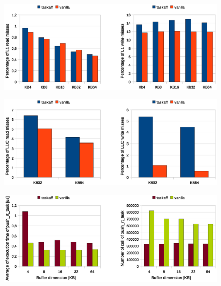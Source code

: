 \begin{figure}[htbp]
\centering
\includegraphics[width=\widefigure]{images/results_xeon/l1_load_store_xeon.eps}
\caption{}
\label{fig:l1_load_store_xeon}
\end{figure}

\begin{figure}[htbp]
\centering
\includegraphics[width=\widefigure]{images/results_xeon/l2_load_store_xeon.eps}
\caption{}
\label{fig:l2_load_store_xeon}
\end{figure}

\begin{figure}[htbp]
\centering
\includegraphics[width=\widefigure]{images/results_xeon/push_xeon.eps}
\caption{}
\label{fig:push_xeon}
\end{figure}

